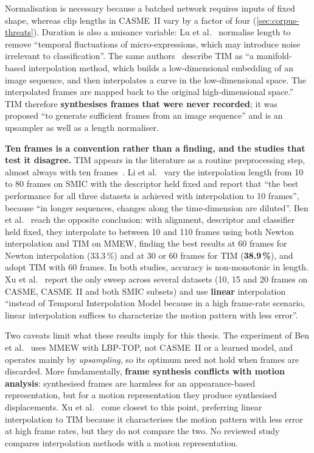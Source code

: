 Normalisation is necessary because a batched network requires inputs of fixed shape, whereas clip lengths in CASME~II vary by a factor of four (\autoref{sec:corpus-threats}). Duration is also a nuisance variable: Lu et al.~\cite{lu2015} normalise length to remove ``temporal fluctuations of micro-expressions, which may introduce noise irrelevant to classification''. The same authors~\cite{lu2015} describe TIM as ``a manifold-based interpolation method, which builds a low-dimensional embedding of an image sequence, and then interpolates a curve in the low-dimensional space. The interpolated frames are mapped back to the original high-dimensional space.'' TIM therefore \textbf{synthesises frames that were never recorded}; it was proposed ``to generate sufficient frames from an image sequence'' and is an upsampler as well as a length normaliser.

\textbf{Ten frames is a convention rather than a finding, and the studies that test it disagree.} TIM appears in the literature as a routine preprocessing step, almost always with ten frames~\cite{liX2013,liX2018,lu2015}. Li et al.~\cite{liX2018} vary the interpolation length from 10 to 80 frames on SMIC with the descriptor held fixed and report that ``the best performance for all three datasets is achieved with interpolation to 10 frames'', because ``in longer sequences, changes along the time-dimension are diluted''. Ben et al.~\cite{ben2021} reach the opposite conclusion: with alignment, descriptor and classifier held fixed, they interpolate to between 10 and 110 frames using both Newton interpolation and TIM on MMEW, finding the best results at 60 frames for Newton interpolation (33.3\,\%) and at 30 or 60 frames for TIM (\textbf{38.9\,\%}), and adopt TIM with 60 frames. In both studies, accuracy is non-monotonic in length. Xu et al.~\cite{xu2017} report the only sweep across several datasets (10, 15 and 20 frames on CASME, CASME~II and both SMIC subsets) and use \textbf{linear} interpolation ``instead of Temporal Interpolation Model because in a high frame-rate scenario, linear interpolation suffices to characterize the motion pattern with less error''.

Two caveats limit what these results imply for this thesis. The experiment of Ben et al.~\cite{ben2021} uses MMEW with LBP-TOP, not CASME~II or a learned model, and operates mainly by \textit{upsampling}, so its optimum need not hold when frames are discarded. More fundamentally, \textbf{frame synthesis conflicts with motion analysis}: synthesised frames are harmless for an appearance-based representation, but for a motion representation they produce synthesised displacements. Xu et al.~\cite{xu2017} come closest to this point, preferring linear interpolation to TIM because it characterises the motion pattern with less error at high frame rates, but they do not compare the two. No reviewed study compares interpolation methods with a motion representation.


